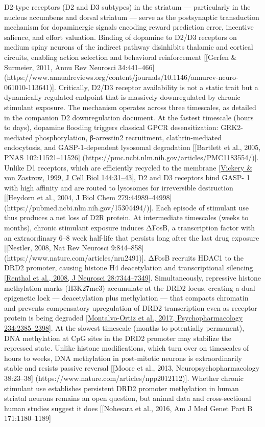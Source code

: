 D2-type receptors (D2 and D3 subtypes) in the striatum --- particularly in the nucleus accumbens and dorsal striatum --- serve as the postsynaptic transduction mechanism for dopaminergic signals encoding reward prediction error, incentive salience, and effort valuation. Binding of dopamine to D2/D3 receptors on medium spiny neurons of the indirect pathway disinhibits thalamic and cortical circuits, enabling action selection and behavioral reinforcement {[}{[}Gerfen \& Surmeier, 2011, Annu Rev Neurosci 34:441--466{]}(https://www.annualreviews.org/content/journals/10.1146/annurev-neuro- 061010-113641){]}. Critically, D2/D3 receptor availability is not a static trait but a dynamically regulated endpoint that is massively downregulated by chronic stimulant exposure. The mechanism operates across three timescales, as detailed in the companion D2 downregulation document. At the fastest timescale (hours to days), dopamine flooding triggers classical GPCR desensitization: GRK2-mediated phosphorylation, β-arrestin2 recruitment, clathrin-mediated endocytosis, and GASP-1-dependent lysosomal degradation {[}{[}Bartlett et al., 2005, PNAS 102:11521--11526{]} (https://pmc.ncbi.nlm.nih.gov/articles/PMC1183554/){]}. Unlike D1 receptors, which are efficiently recycled to the membrane {[}\href{https://pubmed.ncbi.nlm.nih.gov/9885242/}{Vickery \& von Zastrow, 1999, J Cell Biol 144:31--43}{]}, D2 and D3 receptors bind GASP- 1 with high affinity and are routed to lysosomes for irreversible destruction {[}{[}Heydorn et al., 2004, J Biol Chem 279:44989--44998{]} (https://pubmed.ncbi.nlm.nih.gov/15304494/){]}. Each episode of stimulant use thus produces a net loss of D2R protein. At intermediate timescales (weeks to months), chronic stimulant exposure induces ΔFosB, a transcription factor with an extraordinary 6--8 week half-life that persists long after the last drug exposure {[}{[}Nestler, 2008, Nat Rev Neurosci 9:844--858{]} (https://www.nature.com/articles/nrn2491){]}. ΔFosB recruits HDAC1 to the DRD2 promoter, causing histone H4 deacetylation and transcriptional silencing {[}\href{https://pubmed.ncbi.nlm.nih.gov/18632938/}{Renthal et al., 2008, J Neurosci 28:7344--7349}{]}. Simultaneously, repressive histone methylation marks (H3K27me3) accumulate at the DRD2 locus, creating a dual epigenetic lock --- deacetylation plus methylation --- that compacts chromatin and prevents compensatory upregulation of DRD2 transcription even as receptor protein is being degraded {[}\href{https://pubmed.ncbi.nlm.nih.gov/28421257/}{Montalvo-Ortiz et al., 2017, Psychopharmacology 234:2385--2398}{]}. At the slowest timescale (months to potentially permanent), DNA methylation at CpG sites in the DRD2 promoter may stabilize the repressed state. Unlike histone modifications, which turn over on timescales of hours to weeks, DNA methylation in post-mitotic neurons is extraordinarily stable and resists passive reversal {[}{[}Moore et al., 2013, Neuropsychopharmacology 38:23--38{]} (https://www.nature.com/articles/npp2012112){]}. Whether chronic stimulant use establishes persistent DRD2 promoter methylation in human striatal neurons remains an open question, but animal data and cross-sectional human studies suggest it does {[}{[}Nohesara et al., 2016, Am J Med Genet Part B 171:1180--1189{]} 